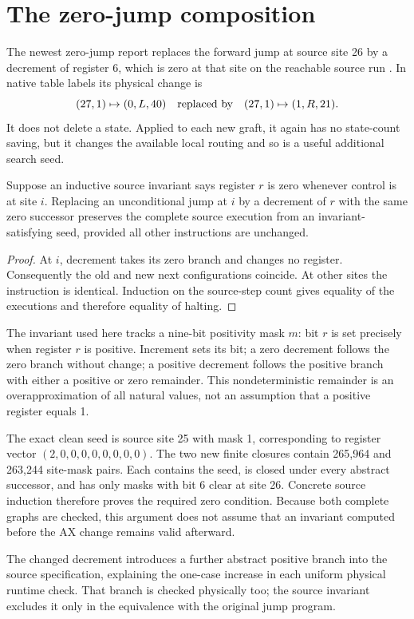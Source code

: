 \section{The zero-jump composition}

The newest zero-jump report replaces the forward jump at source site 26
by a decrement of register 6, which is zero at that site on the reachable
source run \cite{zerojump}. In native table labels its physical change is
\[
       (27,1)\mapsto(0,L,40)
       \quad\hbox{replaced by}\quad
       (27,1)\mapsto(1,R,21).
\]
It does not delete a state. Applied to each new graft, it again has no
state-count saving, but it changes the available local routing and so is
a useful additional search seed.

\begin{lemma}
Suppose an inductive source invariant says register $r$ is zero whenever
control is at site $i$. Replacing an unconditional jump at $i$ by a
decrement of $r$ with the same zero successor preserves the complete
source execution from an invariant-satisfying seed, provided all other
instructions are unchanged.
\end{lemma}
\begin{proof}
At $i$, decrement takes its zero branch and changes no register.
Consequently the old and new next configurations coincide. At other
sites the instruction is identical. Induction on the source-step count
gives equality of the executions and therefore equality of halting.
\end{proof}

The invariant used here tracks a nine-bit positivity mask $m$: bit $r$
is set precisely when register $r$ is positive. Increment sets its bit;
a zero decrement follows the zero branch without change; a positive
decrement follows the positive branch with either a positive or zero
remainder. This nondeterministic remainder is an overapproximation of
all natural values, not an assumption that a positive register equals 1.

The exact clean seed is source site 25 with mask 1, corresponding to
register vector $(2,0,0,0,0,0,0,0,0)$. The two new finite closures contain
265,964 and 263,244 site-mask pairs. Each contains the seed, is closed
under every abstract successor, and has only masks with bit 6 clear at
site 26. Concrete source induction therefore proves the required zero
condition. Because both complete graphs are checked, this argument does
not assume that an invariant computed before the AX change remains valid
afterward.

The changed decrement introduces a further abstract positive branch into
the source specification, explaining the one-case increase in each
uniform physical runtime check. That branch is checked physically too;
the source invariant excludes it only in the equivalence with the
original jump program.

